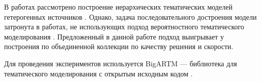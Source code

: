 В работах \cite{hetHTM1, ametyst} рассмотрено построение иерархических тематических моделей гетерогенных источников . Однако, 
задача последовательного достроения модели затронута в работах, не использующих подход вероятностного тематического моделирования \cite{IncHClustering}.
Предложенный в данной работе подход выигрывает у построения по объединенной коллекции по качеству решения и скорости.

Для проведения экспериментов используется BigARTM --- библиотека для тематического моделирования с открытым исходным кодом \cite{Vorontsov2015a, Frei2017}.